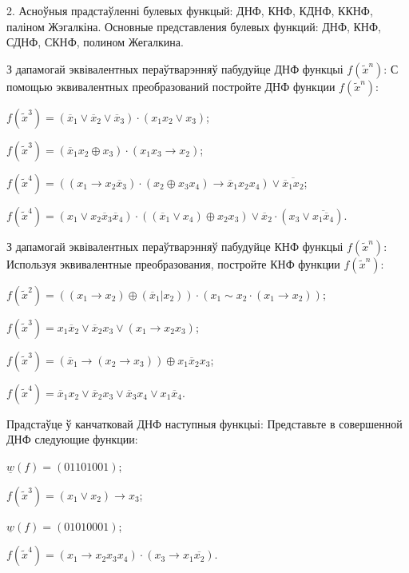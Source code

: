 \documentclass[12pt, a4paper]{article}
\begin{document}
\biLangHeader
{2. Асноўныя прадстаўленні булевых функцый: ДНФ, КНФ, КДНФ, ККНФ, паліном Жэгалкіна.}
{Основные представления булевых функций: ДНФ, КНФ, СДНФ, СКНФ, полином Жегалкина.}

\begin{problemList}

\problemItemWithCommonPart
{З дапамогай эквівалентных пераўтварэнняў пабудуйце ДНФ функцыі $f(\tilde x^n)$:}
{С помощью эквивалентных преобразований постройте ДНФ функции $f(\tilde x^n)$:}
{%
\begin{belarusianEnumerate}
    \item $f(\tilde x^3)=(\overline{x}_1 \vee \overline{x}_2 \vee \overline{x}_3)\cdot (x_1x_2\vee x_3)$;
    \item $f(\tilde x^3)=(\overline{x}_1x_2\oplus x_3)\cdot(x_1x_3\rightarrow x_2)$;
    \item $f(\tilde x^4)=((x_1\rightarrow x_2\overline{x}_3)\cdot (x_2\oplus x_3x_4)\rightarrow\overline{x}_1x_2x_4)\vee \overline{\overline{x}_1x_2}$;
    \item $f(\tilde x^4)=(x_1\vee x_2\overline{x}_3\overline{x}_4)\cdot ((\overline{x}_1\vee x_4)\oplus x_2x_3)\vee \overline{x}_2\cdot(x_3 \vee \overline{x_1\overline{x}_4})$.
\end{belarusianEnumerate}
}

\smallskip

\problemItemWithCommonPart
{З дапамогай эквівалентных пераўтварэнняў пабудуйце КНФ функцыі $f(\tilde x^n)$:}
{Используя эквивалентные преобразования, постройте КНФ функции $f(\tilde x^n)$:}
{%
\begin{belarusianEnumerate}
    \item $f(\tilde x^2)=((x_1\rightarrow x_2)\oplus (\overline{x}_1|x_2))\cdot(x_1\sim x_2\cdot (x_1\rightarrow x_2))$;
    \item $f(\tilde x^3)=x_1\overline{x}_2\vee\overline{x}_2x_3\vee(x_1\rightarrow x_2x_3)$;
    \item $f(\tilde x^3)=(\overline{x}_1\rightarrow (x_2\rightarrow x_3))\oplus x_1\overline{x}_2x_3$;
    \item $f(\tilde x^4) = \overline{x}_1x_2\vee \overline{x}_2x_3\vee \overline{x}_3x_4\vee x_1\overline{x}_4$.
\end{belarusianEnumerate}
}

\smallskip

\problemItemWithCommonPart
{Прадстаўце ў канчатковай ДНФ наступныя функцыі:}
{Представьте в совершенной ДНФ следующие функции:}
{%
\begin{belarusianEnumerateTwocol}
    \item $\underline{w}(f) = (01101001)$;
    \item $f(\tilde x^3) = (x_1 \vee x_2) \rightarrow x_3$;
    \item $\underline{w}(f) = (01010001)$;
    \item $f(\tilde x^4) = (x_1 \rightarrow x_2x_3x_4)\cdot (x_3 \rightarrow x_1\overline{x_2})$.
\end{belarusianEnumerateTwocol}
}


\end{problemList}
\end{document}

